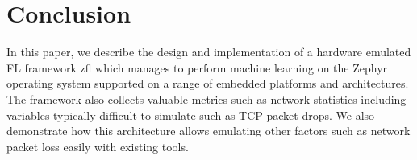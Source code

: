 \documentclass[12pt]{article}
\begin{document}
\section{Conclusion}
In this paper, we describe the design and implementation of a hardware emulated FL framework zfl
which manages to perform machine learning on the Zephyr operating system supported on
a range of embedded platforms and architectures. The framework also collects valuable metrics such
as network statistics including variables typically difficult to simulate such as TCP packet drops.
We also demonstrate how this architecture allows emulating other factors such as network packet loss
easily with existing tools.

\pagebreak
{}


\end{document}
